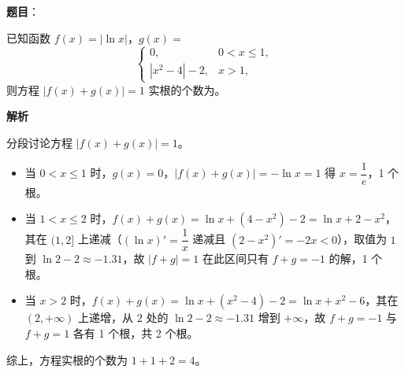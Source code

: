 \begin{answer}

\textbf{题目}：

已知函数 \(f(x)=|\ln x|\)，\(g(x)=\)
\nopagebreak[4]
\[
\begin{cases}
0, & 0<x\leqslant 1,\\
|x^{2}-4|-2, & x>1,
\end{cases}
\]
则方程 \(|f(x)+g(x)|=1\) 实根的个数为\gkblank{}。

\textbf{解析}

分段讨论方程 \(|f(x)+g(x)|=1\)。

\begin{itemize}
\item 当 \(0<x\leqslant1\) 时，\(g(x)=0\)，\(|f(x)+g(x)|=-\ln x=1\) 得 \(x=\dfrac{1}{e}\)，1 个根。
\item 当 \(1<x\leqslant2\) 时，\(f(x)+g(x)=\ln x+(4-x^{2})-2=\ln x+2-x^{2}\)，其在 \((1,2]\) 上递减（\((\ln x)'=\dfrac{1}{x}\) 递减且 \((2-x^{2})'=-2x<0\)），取值为 \(1\) 到 \(\ln2-2\approx-1.31\)，故 \(|f+g|=1\) 在此区间只有 \(f+g=-1\) 的解，1 个根。
\item 当 \(x>2\) 时，\(f(x)+g(x)=\ln x+(x^{2}-4)-2=\ln x+x^{2}-6\)，其在 \((2,+\infty)\) 上递增，从 \(2\) 处的 \(\ln2-2\approx-1.31\) 增到 \(+\infty\)，故 \(f+g=-1\) 与 \(f+g=1\) 各有 1 个根，共 2 个根。
\end{itemize}

综上，方程实根的个数为 \(1+1+2=4\)。


\end{answer}
